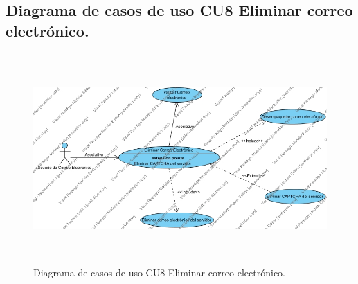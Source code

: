\documentclass[12pt,oneside,onecolumn,openany]{report}
\begin{document}
\pagebreak

\subsection{Diagrama de casos de uso CU8 Eliminar correo electrónico.}
\begin{figure}[H]
	\includegraphics[width=1\linewidth, height=8cm]{./images/casodeuso8.jpg}
	\caption{Diagrama de casos de uso CU8 Eliminar correo electrónico.}
	\label{fig:4-9-1}
\end{figure}
\end{document}
